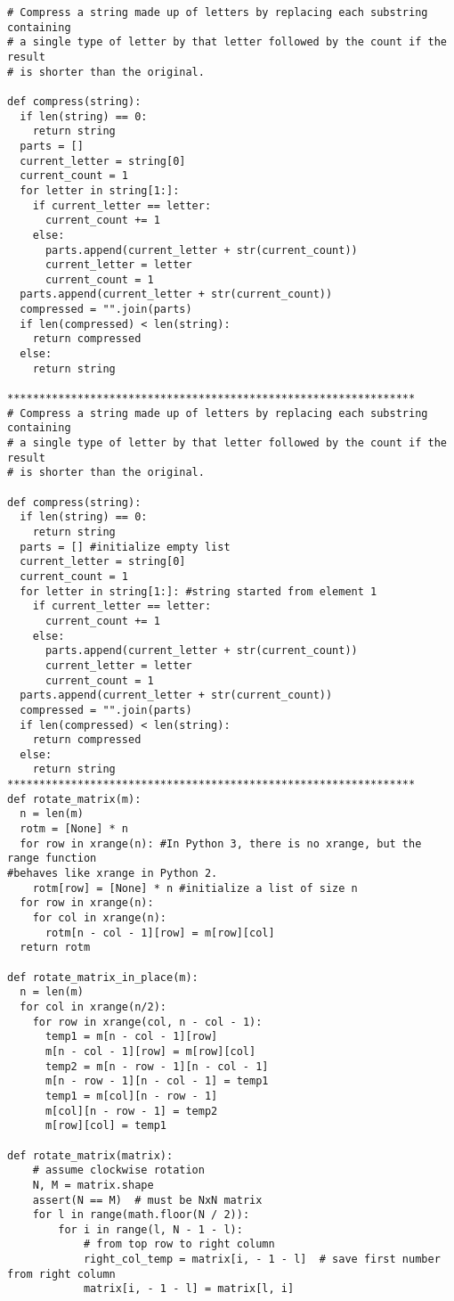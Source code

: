 \documentclass[12pt]{article}
\begin{document}
\begin{lstlisting}
# Compress a string made up of letters by replacing each substring containing
# a single type of letter by that letter followed by the count if the result
# is shorter than the original.

def compress(string):
  if len(string) == 0:
    return string
  parts = []
  current_letter = string[0]
  current_count = 1
  for letter in string[1:]:
    if current_letter == letter:
      current_count += 1
    else:
      parts.append(current_letter + str(current_count))
      current_letter = letter
      current_count = 1
  parts.append(current_letter + str(current_count))
  compressed = "".join(parts)
  if len(compressed) < len(string):
    return compressed
  else:
    return string

****************************************************************
# Compress a string made up of letters by replacing each substring containing
# a single type of letter by that letter followed by the count if the result
# is shorter than the original.

def compress(string):
  if len(string) == 0:
    return string
  parts = [] #initialize empty list
  current_letter = string[0]
  current_count = 1
  for letter in string[1:]: #string started from element 1
    if current_letter == letter:
      current_count += 1
    else:
      parts.append(current_letter + str(current_count))
      current_letter = letter
      current_count = 1
  parts.append(current_letter + str(current_count))
  compressed = "".join(parts) 
  if len(compressed) < len(string):
    return compressed
  else:
    return string
****************************************************************
def rotate_matrix(m):
  n = len(m)
  rotm = [None] * n
  for row in xrange(n): #In Python 3, there is no xrange, but the range function 
#behaves like xrange in Python 2.
    rotm[row] = [None] * n #initialize a list of size n
  for row in xrange(n):
    for col in xrange(n):
      rotm[n - col - 1][row] = m[row][col]
  return rotm

def rotate_matrix_in_place(m):
  n = len(m)
  for col in xrange(n/2):
    for row in xrange(col, n - col - 1):
      temp1 = m[n - col - 1][row]
      m[n - col - 1][row] = m[row][col]
      temp2 = m[n - row - 1][n - col - 1]
      m[n - row - 1][n - col - 1] = temp1
      temp1 = m[col][n - row - 1]
      m[col][n - row - 1] = temp2
      m[row][col] = temp1

def rotate_matrix(matrix):
    # assume clockwise rotation
    N, M = matrix.shape
    assert(N == M)  # must be NxN matrix
    for l in range(math.floor(N / 2)):
        for i in range(l, N - 1 - l):
            # from top row to right column
            right_col_temp = matrix[i, - 1 - l]  # save first number from right column
            matrix[i, - 1 - l] = matrix[l, i]


\end{lstlisting}
\end{document}
